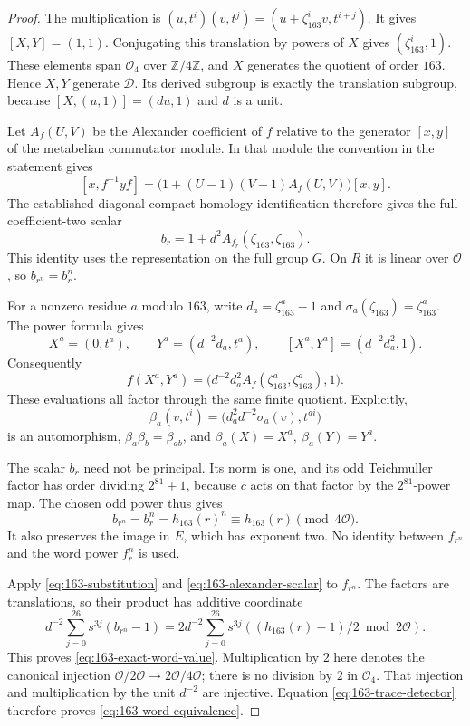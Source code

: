 \begin{proof}
The multiplication is
\((u,t^i)(v,t^j)=(u+\zeta_{163}^iv,t^{i+j})\).
It gives \([X,Y]=(1,1)\).
Conjugating this translation by powers of \(X\) gives
\((\zeta_{163}^i,1)\). These elements span \(\mathcal O_4\)
over \(\mathbb Z/4\mathbb Z\), and \(X\) generates the quotient
of order \(163\). Hence \(X,Y\) generate \(\mathscr D\).
Its derived subgroup is exactly the translation subgroup,
because \([X,(u,1)]=(du,1)\) and \(d\) is a unit.

Let \(A_f(U,V)\) be the Alexander coefficient of \(f\) relative
to the generator \([x,y]\) of the metabelian commutator module.
In that module the convention in the statement gives
\[
 [x,f^{-1}yf]
   =\bigl(1+(U-1)(V-1)A_f(U,V)\bigr)[x,y].
\]
The established diagonal compact-homology identification
therefore gives the full coefficient-two scalar
\begin{equation}
 b_r=1+d^2A_{f_r}(\zeta_{163},\zeta_{163}).
 \label{eq:163-alexander-scalar}
\end{equation}
This identity uses the representation on the full group \(G\).
On \(R\) it is linear over \(\mathcal O\), so
\(b_{r^n}=b_r^n\).

For a nonzero residue \(a\) modulo \(163\), write
\(d_a=\zeta_{163}^a-1\) and
\(\sigma_a(\zeta_{163})=\zeta_{163}^a\).
The power formula gives
\[
 X^a=(0,t^a),\qquad Y^a=(d^{-2}d_a,t^a),\qquad
 [X^a,Y^a]=(d^{-2}d_a^2,1).
\]
Consequently
\begin{equation}
 f(X^a,Y^a)
   =\bigl(d^{-2}d_a^2A_f(\zeta_{163}^a,\zeta_{163}^a),1\bigr).
 \label{eq:163-substitution}
\end{equation}
These evaluations all factor through the same finite quotient.
Explicitly,
\[
 \beta_a(v,t^i)=
       \bigl(d_a^2d^{-2}\sigma_a(v),t^{ai}\bigr)
\]
is an automorphism, \(\beta_a\beta_b=\beta_{ab}\), and
\(\beta_a(X)=X^a,\ \beta_a(Y)=Y^a\).

The scalar \(b_r\) need not be principal. Its norm is one,
and its odd Teichmuller factor has order dividing
\(2^{81}+1\), because \(c\) acts on that factor by the
\(2^{81}\)-power map. The chosen odd power thus gives
\begin{equation}
 b_{r^n}=b_r^n=h_{163}(r)^n
                     \equiv h_{163}(r)\pmod{4\mathcal O}.
 \label{eq:163-odd-power}
\end{equation}
It also preserves the image in \(E\), which has exponent two.
No identity between \(f_{r^n}\) and the word power \(f_r^n\)
is used.

Apply \eqref{eq:163-substitution} and
\eqref{eq:163-alexander-scalar} to \(f_{r^n}\).
The factors are translations, so their product has additive
coordinate
\[
 d^{-2}\sum_{j=0}^{26}s^{3j}(b_{r^n}-1)
   =2d^{-2}\sum_{j=0}^{26}s^{3j}
             \left((h_{163}(r)-1)/2\bmod2\mathcal O\right).
\]
This proves \eqref{eq:163-exact-word-value}. Multiplication
by \(2\) here denotes the canonical injection
\(\mathcal O/2\mathcal O\to2\mathcal O/4\mathcal O\);
there is no division by \(2\) in \(\mathcal O_4\).
That injection and multiplication by the unit \(d^{-2}\)
are injective. Equation \eqref{eq:163-trace-detector}
therefore proves \eqref{eq:163-word-equivalence}.
\end{proof}


